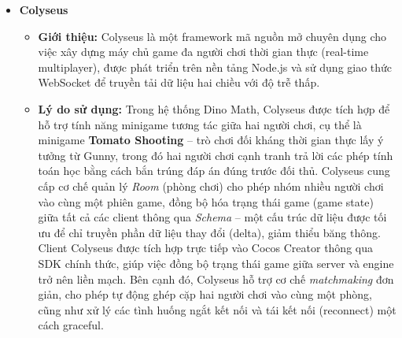 \begin{itemize}
  \item \textbf{Colyseus}
    \begin{itemize}
      \item \textbf{Giới thiệu:} Colyseus là một framework mã nguồn mở chuyên dụng cho việc xây dựng máy chủ game đa người chơi thời gian thực (real-time multiplayer), được phát triển trên nền tảng Node.js và sử dụng giao thức WebSocket để truyền tải dữ liệu hai chiều với độ trễ thấp.
      \item \textbf{Lý do sử dụng:} Trong hệ thống Dino Math, Colyseus được tích hợp để hỗ trợ tính năng minigame tương tác giữa hai người chơi, cụ thể là minigame \textbf{Tomato Shooting} -- trò chơi đối kháng thời gian thực lấy ý tưởng từ Gunny, trong đó hai người chơi cạnh tranh trả lời các phép tính toán học bằng cách bắn trúng đáp án đúng trước đối thủ. Colyseus cung cấp cơ chế quản lý \textit{Room} (phòng chơi) cho phép nhóm nhiều người chơi vào cùng một phiên game, đồng bộ hóa trạng thái game (game state) giữa tất cả các client thông qua \textit{Schema} -- một cấu trúc dữ liệu được tối ưu để chỉ truyền phần dữ liệu thay đổi (delta), giảm thiểu băng thông. Client Colyseus được tích hợp trực tiếp vào Cocos Creator thông qua SDK chính thức, giúp việc đồng bộ trạng thái game giữa server và engine trở nên liền mạch. Bên cạnh đó, Colyseus hỗ trợ cơ chế \textit{matchmaking} đơn giản, cho phép tự động ghép cặp hai người chơi vào cùng một phòng, cũng như xử lý các tình huống ngắt kết nối và tái kết nối (reconnect) một cách graceful.
    \end{itemize}
\end{itemize}


